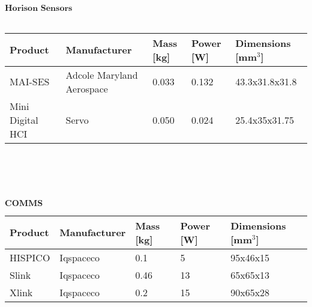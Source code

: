   
		   $\textbf{Horison Sensors}$\\ \\
		   \begin{tabular}{p{3cm}p{3cm}p{2cm}p{2cm}p{2cm}} \toprule
		   	Product & Manufacturer & Mass [kg] & Power [W]& Dimensions [mm$^{3}$]\\ \midrule
		   	
		   		MAI-SES & Adcole Maryland Aerospace & 0.033 & 0.132 & 43.3x31.8x31.8 \\
		   		Mini Digital HCI & Servo & 0.050 & 0.024 & 25.4x35x31.75 \\ \bottomrule
		   \end{tabular}\\ \\ \\ \\
		   
		      $\textbf{COMMS}$\\ 
		     
		      
		      \begin{tabular}{p{3cm}p{3cm}p{2cm}p{2cm}p{2cm}} \toprule
		      	Product & Manufacturer & Mass [kg] & Power [W]& Dimensions [mm$^{3}$]\\ \midrule
		      	
		      	HISPICO & Iqspaceco & 0.1 & 5 & 95x46x15 \\
		      	
		      	Slink & Iqspaceco & 0.46 & 13 & 65x65x13 \\
		      	
		      	Xlink & Iqspaceco & 0.2 & 15 & 90x65x28 \\ \bottomrule
		      \end{tabular}\\ \\ \\ \\ \\ \\ \\ \\ \\ \\ \\ \\ \\ \\ 
		      
